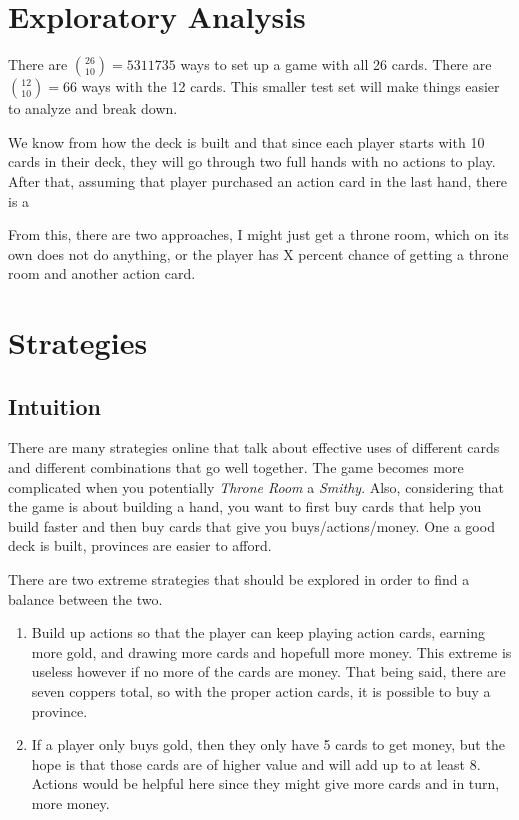 \documentclass[11pt, oneside]{article}   	%
\begin{document}
\section{Exploratory Analysis}

There are $\binom{26}{10} = 5311735$ ways to set up a game with all 26 cards. \newline
\newline
There are $\binom{12}{10} = 66$ ways with the 12 cards. This smaller test set will make things easier to analyze and break down. \newline

We know from how the deck is built and that since each player starts with 10 cards in their deck, they will go through two full hands with no actions to play. After that, assuming that player purchased an action card in the last hand, there is a 

From this, there are two approaches, I might just get a throne room, which on its own does not do anything, or the player has  X percent chance of getting a throne room and another action card. 


\section{Strategies}

\subsection{Intuition}

There are many strategies online that talk about effective uses of different cards and different combinations that go well together. The game becomes more complicated when you potentially \textit{Throne Room} a \textit{Smithy}. Also, considering that the game is about building a hand, you want to first buy cards that help you build faster and then buy cards that give you buys/actions/money. One a good deck is built, provinces are easier to afford. 

There are two extreme strategies that should be explored in order to find a balance between the two.

	\begin{enumerate}
 		 \item Build up actions so that the player can keep playing action cards, earning more gold, and drawing more cards and hopefull more money. This extreme is useless however if no more of the cards are money. That being said, there are seven coppers total, so with the proper action cards, it is possible to buy a province. 
		 \item If a player only buys gold, then they only have 5 cards to get money, but the hope is that those cards are of higher value and will add up to at least 8. Actions would be helpful here since they might give more cards and in turn, more money. 
	\end{enumerate}
	
\end{document}
